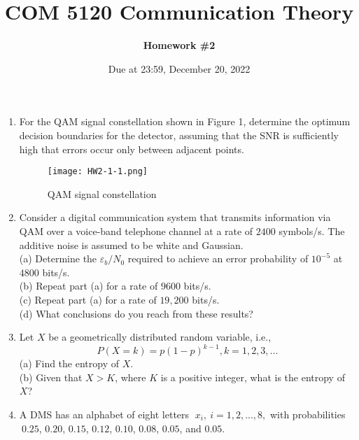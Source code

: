 \documentclass[a4paper,12pt]{article}
\title{\textbf{COM 5120 Communication Theory}}
\author{\textbf{Homework \#2}}
\date{Due at 23:59, December 20, 2022}
\begin{document}
    \maketitle


    \begin{enumerate}
        \item 
            For the QAM signal constellation shown in Figure 1, determine the optimum decision boundaries for the detector, assuming that the SNR is sufficiently high that errors occur only between adjacent points.
            \begin{figure}[h]
            	\centering
            	\texttt{[image: HW2-1-1.png]}
            	\caption{QAM signal constellation}
            \end{figure}
        \item
            Consider a digital communication system that transmits information via QAM over a voice-band telephone channel at a rate of $2400$ symbols/s. The additive noise is assumed to be white and Gaussian. \\
            (a) Determine the $\varepsilon_b / N_0$ required to achieve an error probability of $10^{-5}$ at $4800$ bits/s. \\ 
            (b) Repeat part (a) for a rate of $9600$ bits/s. \\ 
            (c) Repeat part (a) for a rate of $19,200$ bits/s. \\ 
            (d) What conclusions do you reach from these results? \\ 
        \item
            Let $X$ be a geometrically distributed random variable, i.e., $$P(X = k) = p(1-p)^{k - 1}, k = 1, 2, 3, ...$$
            (a) Find the entropy of $X$. \\ 
            (b) Given that $X > K$, where $K$ is a positive integer, what is the entropy of $X$? \\
            \newpage
        \item 
            A DMS has an alphabet of eight letters $\; x_i, \ i = 1, 2,..., 8,$ with probabilities $\ 0.25$, $0.20$, $0.15$, $0.12$, $0.10$, $0.08$, $0.05$, and $0.05$. \\

\end{enumerate}
\end{document}

